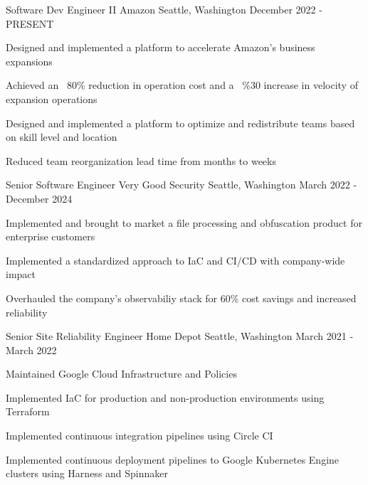 


\begin{cventries}

\cventry
{Software Dev Engineer II} %
{Amazon} %
{Seattle, Washington} %
{December 2022 - PRESENT} %
{ %
\begin{cvitems}
\item{Designed and implemented a platform to accelerate Amazon's business expansions}
\item{Achieved an ~80\% reduction in operation cost and a ~\%30 increase in velocity of expansion operations}
\item{Designed and implemented a platform to optimize and redistribute teams based on skill level and location}
\item{Reduced team reorganization lead time from months to weeks}
\end{cvitems}
}

\cventry
{Senior Software Engineer} %
{Very Good Security} %
{Seattle, Washington} %
{March 2022 - December 2024} %
{ %
\begin{cvitems}
\item{Implemented and brought to market a file processing and obfuscation product for enterprise customers}
\item{Implemented a standardized approach to IaC and CI/CD with company-wide impact}
\item{Overhauled the company's observabiliy stack for 60\% cost savings and increased reliability}
\end{cvitems}
}


\cventry
{Senior Site Reliability Engineer} %
{Home Depot} %
{Seattle, Washington} %
{March 2021 - March 2022} %
{ %
\begin{cvitems}
\item {Maintained Google Cloud Infrastructure and Policies}
\item {Implemented IaC for production and non-production environments using Terraform}
\item {Implemented continuous integration pipelines using Circle CI}
\item {Implemented continuous deployment pipelines to Google Kubernetes Engine clusters using Harness and Spinnaker}
\end{cvitems}
}


\end{cventries}
